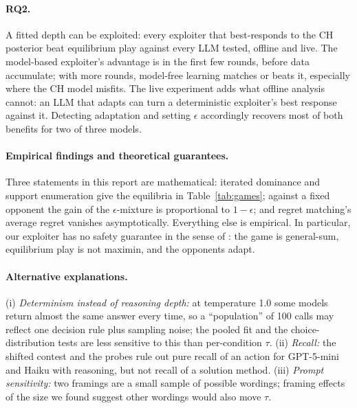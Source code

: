 \documentclass[11pt]{article}
\begin{document}
\paragraph{RQ2.} A fitted depth can be exploited: every exploiter that best-responds to the CH posterior beat equilibrium play against every LLM tested, offline and live. The model-based exploiter's advantage is in the first few rounds, before data accumulate; with more rounds, model-free learning matches or beats it, especially where the CH model misfits. The live experiment adds what offline analysis cannot: an LLM that adapts can turn a deterministic exploiter's best response against it. Detecting adaptation and setting $\epsilon$ accordingly recovers most of both benefits for two of three models.

\paragraph{Empirical findings and theoretical guarantees.} Three statements in this report are mathematical: iterated dominance and support enumeration give the equilibria in Table~\ref{tab:games}; against a fixed opponent the gain of the $\epsilon$-mixture is proportional to $1-\epsilon$; and regret matching's average regret vanishes asymptotically. Everything else is empirical. In particular, our exploiter has no safety guarantee in the sense of \citet{ganzfried2015}: the game is general-sum, equilibrium play is not maximin, and the opponents adapt.

\paragraph{Alternative explanations.} (i) \emph{Determinism instead of reasoning depth:} at temperature 1.0 some models return almost the same answer every time, so a ``population'' of 100 calls may reflect one decision rule plus sampling noise; the pooled fit and the choice-distribution tests are less sensitive to this than per-condition $\tau$. (ii) \emph{Recall:} the shifted contest and the probes rule out pure recall of an action for GPT-5-mini and Haiku with reasoning, but not recall of a solution method. (iii) \emph{Prompt sensitivity:} two framings are a small sample of possible wordings; framing effects of the size we found suggest other wordings would also move $\tau$.
\end{document}
